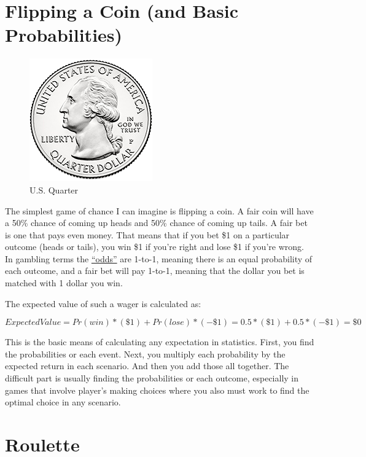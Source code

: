 \documentclass[
]{book}
\begin{document}
\hypertarget{flipping-a-coin}{%
\chapter{Flipping a Coin (and Basic Probabilities)}\label{flipping-a-coin}}

\begin{figure}
\centering
\includegraphics{images/quarter.png}
\caption{U.S. Quarter}
\end{figure}

The simplest game of chance I can imagine is flipping a coin. A fair coin will have a 50\% chance of coming up heads and 50\% chance of coming up tails. A fair bet is one that pays even money. That means that if you bet \$1 on a particular outcome (heads or tails), you win \$1 if you're right and lose \$1 if you're wrong. In gambling terms the \href{https://en.wikipedia.org/wiki/Odds}{``odds''} are 1-to-1, meaning there is an equal probability of each outcome, and a fair bet will pay 1-to-1, meaning that the dollar you bet is matched with 1 dollar you win.

The expected value of such a wager is calculated as:

\[ Expected Value = Pr(win) * (\$1) + Pr(lose) * (-\$1) = 0.5 * (\$1) + 0.5 * (-\$1) = \$0 \]

This is the basic means of calculating any expectation in statistics. First, you find the probabilities or each event. Next, you multiply each probability by the expected return in each scenario. And then you add those all together. The difficult part is usually finding the probabilities or each outcome, especially in games that involve player's making choices where you also must work to find the optimal choice in any scenario.

\hypertarget{roulette}{%
\chapter{Roulette}\label{roulette}}
\end{document}
